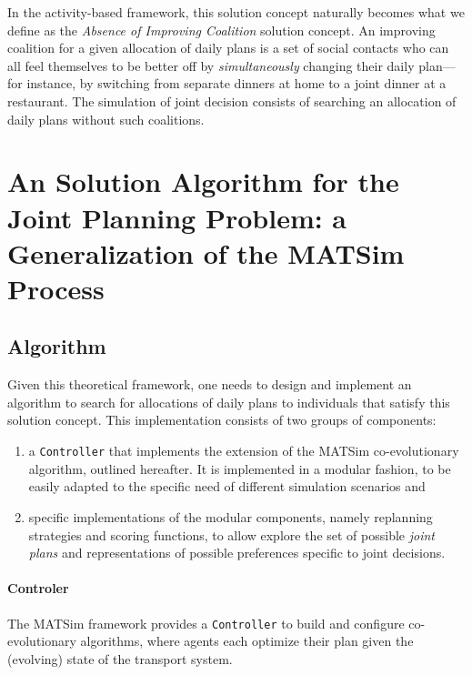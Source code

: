 {In the activity-based framework, this solution concept naturally becomes what we define as the \emph{Absence of Improving Coalition} solution concept. An improving coalition for a given allocation of daily plans is a set of social contacts who can all feel themselves to be better off by \emph{simultaneously} changing their daily plan---for instance, by switching from separate dinners at home to a joint dinner at a restaurant.
The simulation of joint decision consists of searching an allocation of daily plans without such coalitions.

\section{An Solution Algorithm for the Joint Planning Problem: a Generalization of the MATSim Process}
\label{sec:td:algo}
\subsection{Algorithm}
Given this theoretical framework, one needs to design and implement an algorithm to search for allocations of daily plans to individuals that satisfy this solution concept. This implementation consists of two groups of components:
%
\begin{enumerate}
\item a \lstinline|Controller| that implements the extension of the MATSim co-evolutionary algorithm, outlined hereafter. It is implemented in a modular fashion, to be easily adapted to the specific need of different simulation scenarios and
\item specific implementations of the modular components, namely replanning strategies and scoring functions, to allow explore the set of possible \emph{joint plans} and representations of possible preferences specific to joint decisions.
\end{enumerate}

\paragraph{Controler}

The MATSim framework provides a \lstinline|Controller| to build and configure co-evolutionary algorithms, where agents each optimize their plan given the (evolving) state of the transport system.

}
